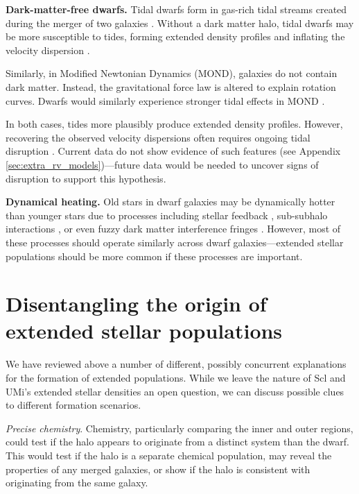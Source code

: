 \textbf{Dark-matter-free dwarfs.} Tidal dwarfs form in gas-rich tidal
streams created during the merger of two galaxies
\citep[e.g.,][]{mirabel+dottori+lutz1992, bournaud+duc2006}. Without a
dark matter halo, tidal dwarfs may be more susceptible to tides, forming
extended density profiles and inflating the velocity dispersion
\citep{casas+2012, yang+2014, wang+2024a}.

Similarly, in Modified Newtonian Dynamics (MOND), galaxies do not
contain dark matter. Instead, the gravitational force law is altered to
explain rotation curves. Dwarfs would similarly experience stronger
tidal effects in MOND \citep{mcgaugh+wolf2010, brada+milgrom2000}.

In both cases, tides more plausibly produce extended density profiles.
However, recovering the observed velocity dispersions often requires
ongoing tidal disruption
\citetext{\citealp{mcgaugh+wolf2010}; \citealp[but see
also][]{sanchez-salcedo+hernandez2007}}. Current data do not show
evidence of such features (see Appendix
\ref{sec:extra_rv_models})---future data would be needed to uncover
signs of disruption to support this hypothesis.

\textbf{Dynamical heating.} Old stars in dwarf galaxies may be
dynamically hotter than younger stars due to processes including stellar
feedback
\citep{stinson+2009, maxwell+2012, el-badry+2016, mercado+2021},
sub-subhalo interactions \citep{penarrubia+2025}, or even fuzzy dark
matter interference fringes
\citep[e.g.,][]{el-zant+2020, duttachowdhury+2023}. However, most of
these processes should operate similarly across dwarf
galaxies---extended stellar populations should be more common if these
processes are important.

\section{Disentangling the origin of extended stellar
populations}\label{disentangling-the-origin-of-extended-stellar-populations}

We have reviewed above a number of different, possibly concurrent
explanations for the formation of extended populations. While we leave
the nature of Scl and UMi's extended stellar densities an open question,
we can discuss possible clues to different formation scenarios.

\emph{Precise chemistry}. Chemistry, particularly comparing the inner
and outer regions, could test if the halo appears to originate from a
distinct system than the dwarf. This would test if the halo is a
separate chemical population, may reveal the properties of any merged
galaxies, or show if the halo is consistent with originating from the
same galaxy.

